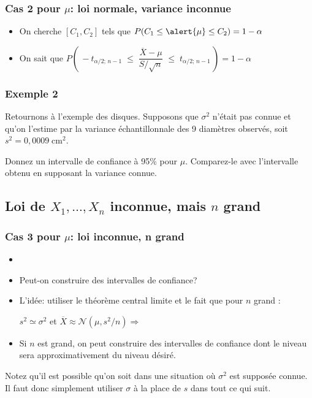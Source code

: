 \documentclass{BeamerTemplate}
\begin{document}
\begin{frame}[t]
 \frametitle{Cas 2 pour $\mu$: loi normale, variance inconnue}

 \begin{itemize} \itemsep3mm
\item On cherche $[C_1, C_2]$ tels que $P(C_1\le \alert{\mu} \le C_2)=1-\alpha$
\item On sait que $P\left(\,-t_{\alpha/2;\, n-1}\;\le \;\dfrac{\overline X - \mu}{S/\sqrt{n}}\;\le \;t_{\alpha/2;\, n-1}\,\right)=1-\alpha$
\end{itemize}

\end{frame}

\begin{frame}[t]
 \frametitle{Exemple 2}
 Retournons à l'exemple des disques. Supposons que $\sigma^2$ n'était pas
 connue et qu'on l'estime par la variance échantil\-lonnale des 9 diamètres observés, soit $s^2= 0,0009 \;\text{cm}^2$.

 \vspace{3mm}

 Donnez un intervalle de confiance à 95\% pour $\mu$. Comparez-le avec l'intervalle obtenu en supposant la variance connue.
\end{frame}

\subsection{Loi de $X_1,\ldots,X_n$ inconnue, mais $n$ grand}

\begin{frame}[t]
 \frametitle{Cas 3 pour $\mu$: loi inconnue, n grand}

 \begin{itemize} \itemsep3mm
\item {\color{blue}{On suppose que $X_1,\ldots,X_n$ sont i.i.d. d'une loi inconnue. }}%
\item  Peut-on construire des intervalles de confiance?

 \item L'idée: utiliser le \alert{théorème  central limite } et le fait  que pour $n$ grand :%

 \vspace{4mm}
  $s^2\simeq \sigma^2$ et $\overline{X}\approx \mathcal{N}(\mu,s^2/n)\Rightarrow$
\vspace{1cm}
\item 
 Si $n$ est grand, on peut construire des intervalles de confiance dont le niveau sera \alert{approximativement}  du niveau désiré.
\end{itemize}

{\small
Notez qu'il est possible qu'on soit dans une situation où $\sigma^2$ est supposée connue. Il faut donc simplement utiliser $\sigma$ à la place de $s$ dans tout ce qui suit.}
\end{frame}
\end{document}
